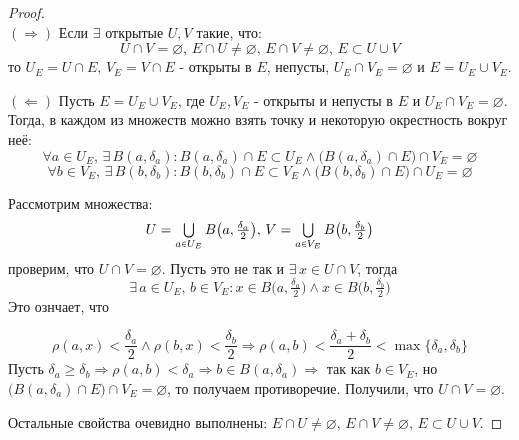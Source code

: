 \documentclass[12pt]{article}
\newcommand{\VN}{\varnothing}
\theoremstyle{definition}
\newcommand{\smallerrel}[1]{\mathrel{\mathpalette\smallerrelaux{#1}}}
\newcommand{\smallerrelaux}[2]{\raisebox{.1ex}{\scalebox{.75}{$#1#2$}}}
\newcommand{\smallin}{\smallerrel{\in}}
\begin{document}
\begin{proof}\hfill\\
	$(\Rightarrow)$ Если $\exists$ открытые $U, V$ такие, что: 
	$$
		U \cap V = \VN, \, E \cap U \neq \VN, \,E \cap V \neq \VN, \, E \subset U \cup V
	$$ 
	то $U_E = U \cap E, \, V_E = V \cap E$ - открыты в $E$, непусты, $U_E \cap V_E = \VN$ и $E = U_E \cup V_E$.
	
	$(\Leftarrow)$ Пусть $E = U_E \cup V_E$, где $U_E, V_E$ - открыты и непусты в $E$ и $U_E \cap V_E = \VN$. Тогда, в каждом из множеств можно взять точку и некоторую окрестность вокруг неё: 
	$$
		\forall a \in U_E, \, \exists \, B(a,\delta_a) \colon B(a,\delta_a) \cap E \subset U_E \wedge \big(B(a,\delta_a)\cap E \big) \cap V_E = \VN
	$$ 
	$$
		\forall b \in V_E, \, \exists \, B(b,\delta_b) \colon B(b,\delta_b) \cap E \subset V_E \wedge \big(B(b,\delta_b)\cap E \big) \cap U_E = \VN
	$$ 
	
	Рассмотрим множества: 
	$$
		U = \textstyle \bigcup\limits_{a \smallin U_E}B\big(a, \tfrac{\delta_a}{2}\big), \, V = \textstyle \bigcup\limits_{a \smallin V_E}B\big(b, \tfrac{\delta_b}{2}\big)
	$$ 
	проверим, что $U \cap V = \VN$. Пусть это не так и $\exists \, x \in U \cap V$, тогда 
	$$
		\exists \, a \in U_E, \, b \in V_E \colon x \in B\big(a,\tfrac{\delta_a}{2}\big)\wedge x \in B\big(b,\tfrac{\delta_b}{2}\big)
	$$
	Это ознчает, что
	
	$$
		\rho(a,x) < \frac{\delta_a}{2} \wedge \rho(b,x) < \frac{\delta_b}{2} \Rightarrow \rho(a,b) < \frac{\delta_a + \delta_b}{2} < \max\{\delta_a,\delta_b\}
	$$
	Пусть $\delta_a \geq \delta_b \Rightarrow \rho(a,b) < \delta_a \Rightarrow b \in B(a,\delta_a) \Rightarrow$ так как $b \in V_E$, но $\big(B(a,\delta_a)\cap E \big) \cap V_E = \VN$, то получаем противоречие. Получили, что  $U \cap V = \VN$.
	
	Остальные свойства очевидно выполнены: $E \cap U \neq \VN, \,E \cap V \neq \VN, \, E \subset U \cup V$.
\end{proof}
\end{document}

